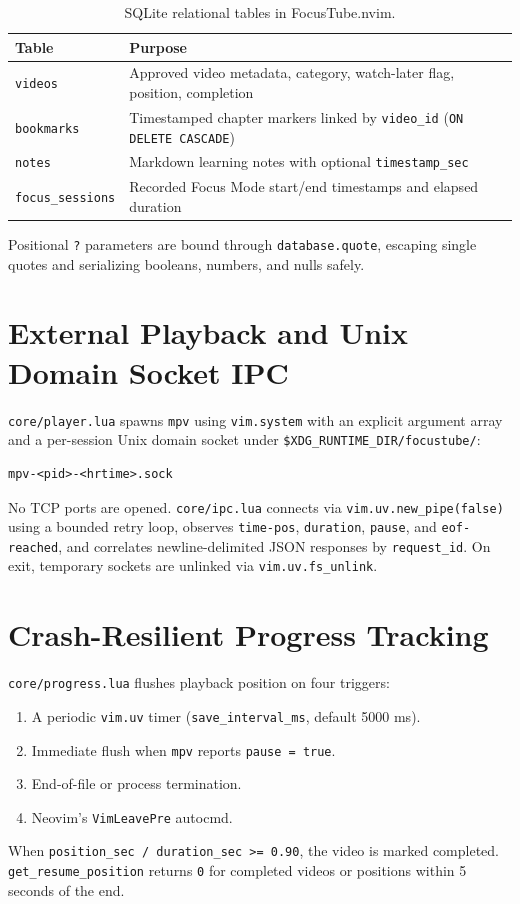 \documentclass[11pt,a4paper]{article}
\begin{document}
\begin{table}[h]
\centering
\begin{tabular}{ll}
\toprule
\textbf{Table} & \textbf{Purpose} \\
\midrule
\texttt{videos} & Approved video metadata, category, watch-later flag, position, completion \\
\texttt{bookmarks} & Timestamped chapter markers linked by \texttt{video\_id} (\texttt{ON DELETE CASCADE}) \\
\texttt{notes} & Markdown learning notes with optional \texttt{timestamp\_sec} \\
\texttt{focus\_sessions} & Recorded Focus Mode start/end timestamps and elapsed duration \\
\bottomrule
\end{tabular}
\caption{SQLite relational tables in FocusTube.nvim.}
\end{table}

Positional \texttt{?} parameters are bound through \texttt{database.quote}, escaping single quotes and serializing booleans, numbers, and nulls safely.

\section{External Playback and Unix Domain Socket IPC}
\texttt{core/player.lua} spawns \texttt{mpv} using \texttt{vim.system} with an explicit argument array and a per-session Unix domain socket under \texttt{\$XDG\_RUNTIME\_DIR/focustube/}:
\begin{verbatim}
mpv-<pid>-<hrtime>.sock
\end{verbatim}
No TCP ports are opened. \texttt{core/ipc.lua} connects via \texttt{vim.uv.new\_pipe(false)} using a bounded retry loop, observes \texttt{time-pos}, \texttt{duration}, \texttt{pause}, and \texttt{eof-reached}, and correlates newline-delimited JSON responses by \texttt{request\_id}. On exit, temporary sockets are unlinked via \texttt{vim.uv.fs\_unlink}.

\section{Crash-Resilient Progress Tracking}
\texttt{core/progress.lua} flushes playback position on four triggers:
\begin{enumerate}
  \item A periodic \texttt{vim.uv} timer (\texttt{save\_interval\_ms}, default 5000 ms).
  \item Immediate flush when \texttt{mpv} reports \texttt{pause = true}.
  \item End-of-file or process termination.
  \item Neovim's \texttt{VimLeavePre} autocmd.
\end{enumerate}
When \texttt{position\_sec / duration\_sec >= 0.90}, the video is marked completed. \texttt{get\_resume\_position} returns \texttt{0} for completed videos or positions within 5 seconds of the end.
\end{document}
